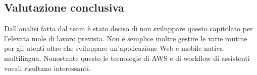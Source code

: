     \subsection{Valutazione conclusiva}
    Dall'analisi fatta dal team è stato deciso di non sviluppare questo capitolato per l'elevata mole di lavoro prevista.
    Non è semplice inoltre gestire le varie routine per gli utenti oltre che sviluppare un'applicazione Web e mobile nativa multilingua.
    Nonostante questo le tecnologie di AWS e di workflow di assistenti vocali risultano interessanti.
